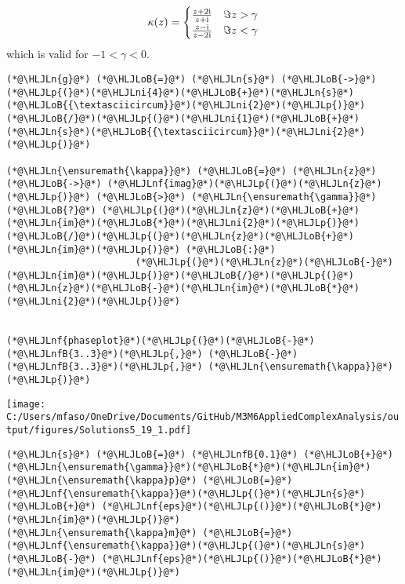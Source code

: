 \documentclass[12pt,landscape]{article}
\newcommand{\HLJLn}[1]{#1}
\newcommand{\HLJLnf}[1]{\textcolor[RGB]{66,102,213}{#1}}
\newcommand{\HLJLnfB}[1]{\textcolor[RGB]{59,151,46}{#1}}
\newcommand{\HLJLni}[1]{\textcolor[RGB]{59,151,46}{#1}}
\newcommand{\HLJLoB}[1]{\textcolor[RGB]{102,102,102}{\textbf{#1}}}
\newcommand{\HLJLp}[1]{#1}
\def\I{ {\rm i} }
\begin{document}
{\[
\kappa(z) =  \begin{cases} {z + 2\I  \over z + \I}  & \Im z > \gamma \\
                            {z - \I  \over z - 2\I} & \Im z < \gamma
                            \end{cases}
\]
which is valid for $-1 < \gamma < 0$.


\begin{lstlisting}
(*@\HLJLn{g}@*) (*@\HLJLoB{=}@*) (*@\HLJLn{s}@*) (*@\HLJLoB{->}@*) (*@\HLJLp{(}@*)(*@\HLJLni{4}@*)(*@\HLJLoB{+}@*)(*@\HLJLn{s}@*)(*@\HLJLoB{{\textasciicircum}}@*)(*@\HLJLni{2}@*)(*@\HLJLp{)}@*)(*@\HLJLoB{/}@*)(*@\HLJLp{(}@*)(*@\HLJLni{1}@*)(*@\HLJLoB{+}@*)(*@\HLJLn{s}@*)(*@\HLJLoB{{\textasciicircum}}@*)(*@\HLJLni{2}@*)(*@\HLJLp{)}@*)

(*@\HLJLn{\ensuremath{\kappa}}@*) (*@\HLJLoB{=}@*) (*@\HLJLn{z}@*) (*@\HLJLoB{->}@*) (*@\HLJLnf{imag}@*)(*@\HLJLp{(}@*)(*@\HLJLn{z}@*)(*@\HLJLp{)}@*) (*@\HLJLoB{>}@*) (*@\HLJLn{\ensuremath{\gamma}}@*) (*@\HLJLoB{?}@*) (*@\HLJLp{(}@*)(*@\HLJLn{z}@*)(*@\HLJLoB{+}@*)(*@\HLJLn{im}@*)(*@\HLJLoB{*}@*)(*@\HLJLni{2}@*)(*@\HLJLp{)}@*)(*@\HLJLoB{/}@*)(*@\HLJLp{(}@*)(*@\HLJLn{z}@*)(*@\HLJLoB{+}@*)(*@\HLJLn{im}@*)(*@\HLJLp{)}@*) (*@\HLJLoB{:}@*)
                       (*@\HLJLp{(}@*)(*@\HLJLn{z}@*)(*@\HLJLoB{-}@*)(*@\HLJLn{im}@*)(*@\HLJLp{)}@*)(*@\HLJLoB{/}@*)(*@\HLJLp{(}@*)(*@\HLJLn{z}@*)(*@\HLJLoB{-}@*)(*@\HLJLn{im}@*)(*@\HLJLoB{*}@*)(*@\HLJLni{2}@*)(*@\HLJLp{)}@*)


(*@\HLJLnf{phaseplot}@*)(*@\HLJLp{(}@*)(*@\HLJLoB{-}@*)(*@\HLJLnfB{3..3}@*)(*@\HLJLp{,}@*) (*@\HLJLoB{-}@*)(*@\HLJLnfB{3..3}@*)(*@\HLJLp{,}@*) (*@\HLJLn{\ensuremath{\kappa}}@*)(*@\HLJLp{)}@*)
\end{lstlisting}

\texttt{[image: C:/Users/mfaso/OneDrive/Documents/GitHub/M3M6AppliedComplexAnalysis/output/figures/Solutions5\_19\_1.pdf]}

\begin{lstlisting}
(*@\HLJLn{s}@*) (*@\HLJLoB{=}@*) (*@\HLJLnfB{0.1}@*) (*@\HLJLoB{+}@*) (*@\HLJLn{\ensuremath{\gamma}}@*)(*@\HLJLoB{*}@*)(*@\HLJLn{im}@*)
(*@\HLJLn{\ensuremath{\kappa}p}@*) (*@\HLJLoB{=}@*) (*@\HLJLnf{\ensuremath{\kappa}}@*)(*@\HLJLp{(}@*)(*@\HLJLn{s}@*) (*@\HLJLoB{+}@*) (*@\HLJLnf{eps}@*)(*@\HLJLp{()}@*)(*@\HLJLoB{*}@*)(*@\HLJLn{im}@*)(*@\HLJLp{)}@*)
(*@\HLJLn{\ensuremath{\kappa}m}@*) (*@\HLJLoB{=}@*) (*@\HLJLnf{\ensuremath{\kappa}}@*)(*@\HLJLp{(}@*)(*@\HLJLn{s}@*) (*@\HLJLoB{-}@*) (*@\HLJLnf{eps}@*)(*@\HLJLp{()}@*)(*@\HLJLoB{*}@*)(*@\HLJLn{im}@*)(*@\HLJLp{)}@*)


\end{lstlisting}}
\end{document}
